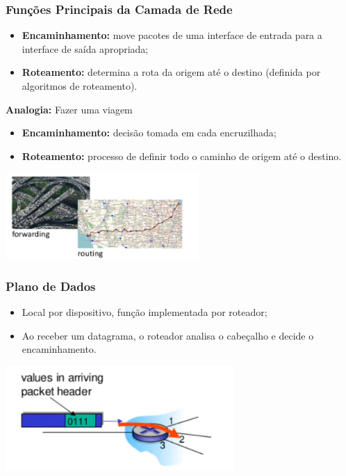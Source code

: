         \subsubsection*{Funções Principais da Camada de Rede}
            \begin{itemize}[left=0.5cm, align=left, nosep]
                \item \textbf{Encaminhamento:} move pacotes de uma interface de entrada para a interface de saída apropriada;
                \item \textbf{Roteamento:} determina a rota da origem até o destino (definida por algoritmos de roteamento).
            \end{itemize}

            \textbf{Analogia:} Fazer uma viagem
            \begin{itemize}[left=0.5cm, align=left, nosep]
                \item \textbf{Encaminhamento:} decisão tomada em cada encruzilhada;
                \item \textbf{Roteamento:} processo de definir todo o caminho de origem até o destino.
            \end{itemize}

            \begin{center}
                \includegraphics[width=0.55\textwidth]{img/cap-04/viagem.png}
            \end{center}

        \subsubsection*{Plano de Dados}
            \begin{itemize}[left=0.5cm, align=left, nosep]
                \item Local por dispositivo, função implementada por roteador;
                \item Ao receber um datagrama, o roteador analisa o cabeçalho e decide o encaminhamento.
            \end{itemize}

            \begin{center}
                \includegraphics[width=0.65\textwidth]{img/cap-04/plano-de-dados.png}
            \end{center}


